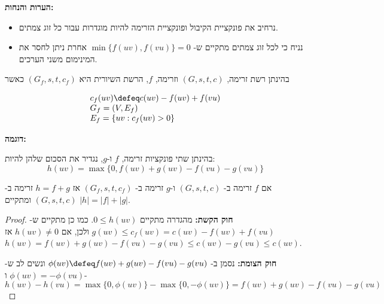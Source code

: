 \textbf{הערות והנחות:}
\begin{itemize}
\item
נרחיב את פונקציית הקיבול ופונקציית הזרימה להיות מוגדרות עבור כל זוג צמתים.
\item
נניח כי לכל זוג צמתים מתקיים ש-%
$\min\{f(uv), f(vu)\} = 0$
אחרת ניתן לחסר את המינימום משני הערכים.
\end{itemize}

\begin{definition}
בהינתן רשת זרימה,
$(G, s, t, c)$
וזרימה, $f$, הרשת השיורית היא
$(G_f, s, t, c_f)$
כאשר

$$
\begin{array}{l}
c_f(uv) \defeq c(uv) - f(uv) + f(vu)
\\
{G_f = (V, E_f)}
\\
E_f = \{uv : c_f(uv) > 0\}
\end{array}
$$
\end{definition}

\textbf{דוגמה:}

\begin{center}
\end{center}

\begin{definition}
בהינתן שתי פונקציות זרימה, $f$ ו-$g$, נגדיר את הסכום שלהן להיות:
$$
h(uv) = \max\{0, f(uv) + g(uv) - f(vu) - g(vu)\}
$$
\end{definition}

\begin{lemma}
אם $f$ זרימה ב-%
$(G, s, t, c)$
ו-$g$ זרימה ב-%
$(G_f, s, t, c_f)$
אז 
$h = f + g$
זרימה ב-%
$(G, s, t, c)$
ומתקיים 
$|h| = |f| + |g|$.
\end{lemma}

\begin{proof}
\textbf{חוק הקשת:}
מהגדרה מתקיים 
$0 \leq h(uv)$.
כמו כן מתקיים ש-%
$g(uv) \leq c_f(uv) = c(uv) - f(uv) + f(vu)$
ולכן, אם
$h(uv) \neq 0$
אז
$h(uv) = f(uv) + g(uv) - f(vu) - g(vu) \leq c(uv) - g(vu) \leq c(uv)$.

\textbf{חוק הצומת:}
נסמן ב-%
$\phi(uv) \defeq f(uv) + g(uv) - f(vu) - g(vu)$
ונשים לב ש-%
$\phi(uv) = -\phi(vu)$
ו-%
$$
h(uv) - h(vu) = 
\max\{0, \phi(uv)\} - 
\max\{0, -\phi(uv)\} = 
f(uv) + g(uv) - f(vu) - g(vu)
$$
\end{proof}
